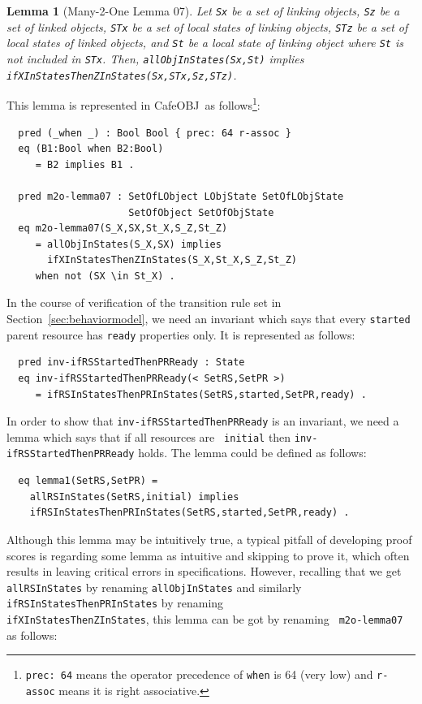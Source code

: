 \documentclass[12pt]{report}
\newtheorem{lemma}{Lemma}
\newcommand{\stt}[1]{{\small{\tt {#1}}}}
\newcommand{\cafeobj}{{\sf CafeOBJ}~}
\begin{document}
\begin{lemma}[Many-2-One Lemma 07]
  Let {\tt Sx} be a set of linking objects, {\tt Sz} be a set of
  linked objects, {\tt STx} be a set of local states of linking
  objects, {\tt STz} be a set of local states of linked objects, and
  {\tt St} be a local state of linking object where {\tt St} is not
  included in {\tt STx}. Then, \stt{allObjInStates(Sx,St)} implies
  \stt{ifXInStatesThenZInStates(Sx,STx,Sz,STz)}.
\end{lemma}
This lemma is represented in \cafeobj as follows\footnote{\stt{prec:~64} 
means the operator precedence of {\tt when} is 64 (very low) and 
{\tt r-assoc} means it is right associative.}:
\begin{verbatim}
  pred (_when _) : Bool Bool { prec: 64 r-assoc }
  eq (B1:Bool when B2:Bool)
     = B2 implies B1 .

  pred m2o-lemma07 : SetOfLObject LObjState SetOfLObjState 
                     SetOfObject SetOfObjState
  eq m2o-lemma07(S_X,SX,St_X,S_Z,St_Z)
     = allObjInStates(S_X,SX) implies 
       ifXInStatesThenZInStates(S_X,St_X,S_Z,St_Z)
     when not (SX \in St_X) .
\end{verbatim}
In the course of verification of the transition rule set in
Section~\ref{sec:behaviormodel}, we need an invariant which says that
every {\tt started} parent resource has {\tt ready} properties
only. It is represented as follows:
\begin{verbatim}
  pred inv-ifRSStartedThenPRReady : State
  eq inv-ifRSStartedThenPRReady(< SetRS,SetPR >)
     = ifRSInStatesThenPRInStates(SetRS,started,SetPR,ready) .
\end{verbatim}
In order to show that {\tt inv-ifRSStartedThenPRReady} is an
invariant, we need a lemma which says that if all resources are {\tt
  initial} then {\tt inv-ifRSStartedThenPRReady} holds.  The lemma
could be defined as follows:
\begin{verbatim}
  eq lemma1(SetRS,SetPR) =
    allRSInStates(SetRS,initial) implies
    ifRSInStatesThenPRInStates(SetRS,started,SetPR,ready) .
\end{verbatim}
Although this lemma may be intuitively true, a typical pitfall of
developing proof scores is regarding some lemma as intuitive and
skipping to prove it, which often results in leaving critical errors
in specifications. However, recalling that we get {\tt allRSInStates}
by renaming {\tt allObjInStates} and similarly
{\tt ifRSInStatesThenPRInStates} by renaming\\
{\tt ifXInStatesThenZInStates}, this lemma can be got by renaming {\tt
  m2o-lemma07} as follows:
\end{document}
